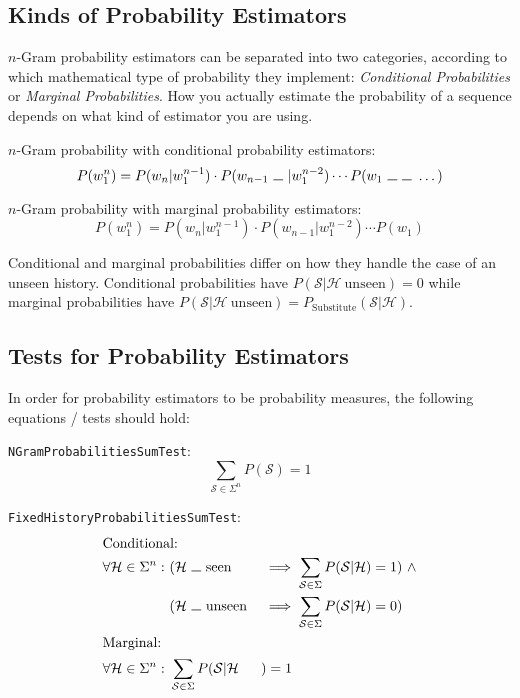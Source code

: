\documentclass[11pt,a4paper]{article}
\newcommand{\Seq}{\mathcal{S}}
\newcommand{\Hist}{\mathcal{H}}
\newcommand{\Skp}{\rule{7pt}{.5pt}}
\begin{document}
  \subsection{Kinds of Probability Estimators}

  $n$-Gram probability estimators can be separated into two categories,
  according to which mathematical type of probability they implement:
  \emph{Conditional Probabilities} or \emph{Marginal Probabilities}. How you
  actually estimate the probability of a sequence depends on what kind of
  estimator you are using.

  $n$-Gram probability with conditional probability estimators:
  \begin{equation}
    P(w_1^n) = P(w_n | w_1^{n-1}) \cdot P(w_{n-1} ~ \Skp ~ | w_1^{n-2}) \dotsm P(w_1 ~ \Skp ~ \Skp ~ \dotso)
  \end{equation}

  $n$-Gram probability with marginal probability estimators:
  \begin{equation}
    P(w_1^n) = P(w_n | w_1^{n-1}) \cdot P(w_{n-1} | w_1^{n-2}) \dotsm P(w_1)
  \end{equation}

  Conditional and marginal probabilities differ  on how they handle the case of
  an unseen history. Conditional probabilities have
  $P(\Seq | \Hist ~ \mathrm{unseen}) = 0$
  while marginal probabilities have
  $P(\Seq | \Hist ~ \mathrm{unseen}) = P_\mathrm{Substitute}(\Seq | \Hist)$.

  \subsection{Tests for Probability Estimators}

  In order for probability estimators to be probability measures, the
  following equations / tests should hold:

  \texttt{NGramProbabilitiesSumTest}:
  \begin{equation}
    \sum_{\Seq \in \Sigma^n} P(\Seq) = 1
  \end{equation}

  \texttt{FixedHistoryProbabilitiesSumTest}:
  \begin{alignat}{2}
    \intertext{Conditional:}
    \forall \Hist \in \Sigma^n :
    ~&(\Hist ~ \Skp ~ \mathrm{seen} &&\implies \sum_{\Seq \in \Sigma} P(\Seq | \Hist) = 1)  ~ \land \\
    ~&(\Hist ~ \Skp ~ \mathrm{unseen} &&\implies \sum_{\Seq \in \Sigma} P(\Seq | \Hist) = 0) \notag \\
    \intertext{Marginal:}
    \forall \Hist \in \Sigma^n:
    ~&\sum_{\Seq \in \Sigma} P(\Seq | \Hist&&) = 1
  \end{alignat}
\end{document}
